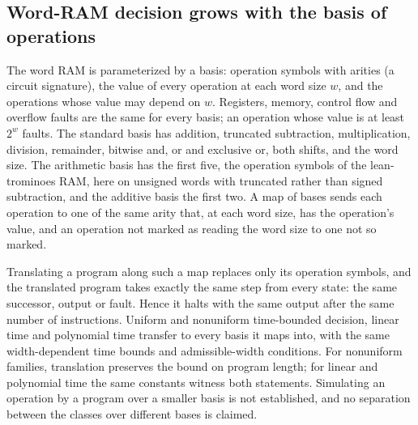 \begin{result}
\subsection{Word-RAM decision grows with the basis of operations}
The word RAM is parameterized by a basis: operation symbols with arities (a circuit signature),
the value of every operation at each word size $w$, and the operations whose value may depend on
$w$. Registers, memory, control flow and overflow faults are the same for every basis; an
operation whose value is at least $2^w$ faults. The standard basis has addition, truncated
subtraction, multiplication, division, remainder, bitwise and, or and exclusive or, both shifts,
and the word size. The arithmetic basis has the first five, the operation symbols of the
lean-trominoes RAM, here on unsigned words with truncated rather than signed subtraction, and the
additive basis the first two. A map of bases sends each operation to one of the same arity that,
at each word size, has the operation's value, and an operation not marked as reading the word size
to one not so marked.

Translating a program along such a map replaces only its operation symbols, and the translated
program takes exactly the same step from every state: the same successor, output or fault. Hence
it halts with the same output after the same number of instructions. Uniform and nonuniform
time-bounded decision, linear time and polynomial time transfer to every basis it maps into,
with the same width-dependent time bounds and admissible-width conditions. For nonuniform
families, translation preserves the bound on program length; for linear and polynomial time
the same constants witness both statements. Simulating an operation by a
program over a smaller basis is not established, and no separation between the classes over
different bases is claimed.
\citep{Hagerup1998,AnderssonMiltersenThorup1999,Tromino2025}
\end{result}

